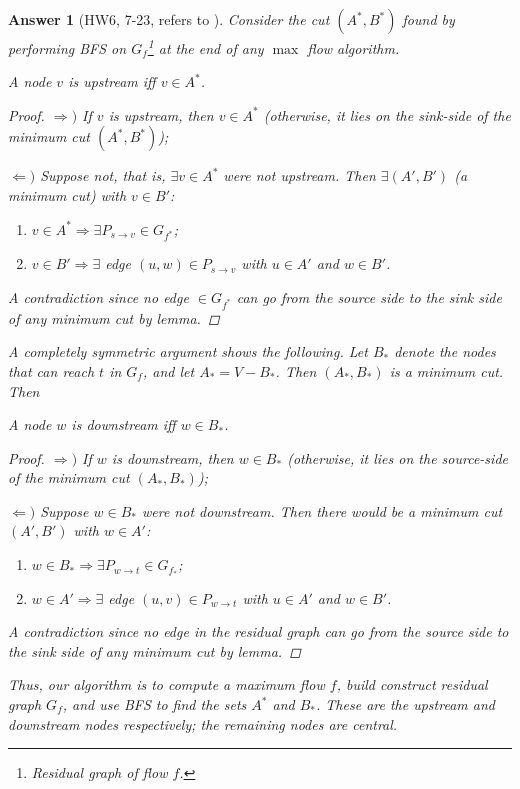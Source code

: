 \documentclass[11pt]{article}
\theoremstyle{numberplain}
\theoremstyle{nonumberplain}
\newtheorem{proof}{Proof}
\newtheorem{ans}{Answer}
\newcommand{\0}{{\mathbf{0}}}
\begin{document}
\begin{ans}[HW6, 7-23, refers to \cite{solcornell}] 
Consider the cut $(A^*,B^*)$ found by performing
BFS on $G_f$\footnote{Residual graph of flow $f$.} at the end of 
any $\max$ flow algorithm.
\begin{State}[Claim 1]
A node $v$ is upstream iff $v \in A^*$.
\end{State}
\begin{proof}
$\Rightarrow)$ If $v$ is upstream, then $v\in A^*$ (otherwise, it lies on the sink-side of the minimum cut $(A^*,B^*)$); 

$\Leftarrow) $ Suppose not, that is, $\exists v \in A^*$ were not upstream.
Then $\exists (A',B')$ (a minimum cut) with $v \in B'$:
\begin{enumerate}
\item $v \in A^*\Rightarrow \exists P_{s\rightarrow v}\in G_{f^*}$;
\item $v \in B'\Rightarrow \exists $ edge $(u,w)\in P_{s\rightarrow v}$ with
$u \in A'$ and $w \in B'$.
\end{enumerate}
A contradiction since no edge $\in G_{f^*}$ can go from the source side to the sink side
of any minimum cut by lemma.
\end{proof}
A completely symmetric argument shows the following.
Let $B_*$ denote the nodes that can reach $t$ in $G_f$,
and let $A_* = V - B_*$.
Then $(A_*, B_*)$ is a minimum cut. Then
\begin{State}[Claim 2]
A node $w$ is downstream iff $w \in B_*$.
\end{State}
\begin{proof}
$\Rightarrow)$ If $w$ is downstream, then $w\in B_*$ (otherwise, it lies on the source-side of the minimum cut $(A_*,B_*)$); 

$\Leftarrow) $ Suppose $w \in B_*$ were not downstream.
Then there would be a minimum cut $(A',B')$ with $w \in A'$:
\begin{enumerate}
\item $w \in B_*\Rightarrow \exists P_{w\rightarrow t}\in G_{f_*}$;
\item $w \in A'\Rightarrow \exists $ edge $(u,v)\in P_{w\rightarrow t}$ with
$u \in A'$ and $w \in B'$.
\end{enumerate}
A contradiction since no edge in the
residual graph can go from the source side to the sink side of any minimum cut by lemma.
\end{proof}

Thus, our algorithm is to compute a maximum flow $f$, 
build construct residual graph $G_f$, and use BFS to find the
sets $A^*$ and $B_*$.
These are the upstream and downstream nodes respectively;
the remaining nodes are central.
\end{ans}
\end{document}
